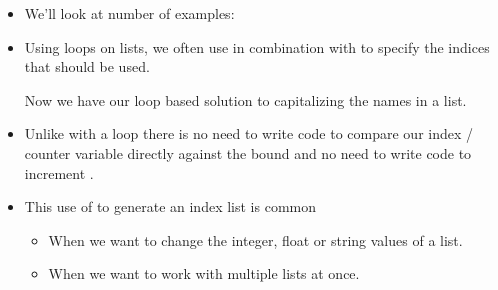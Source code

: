 \documentclass[letterpaper,10pt,english]{sphinxmanual}
\begin{document}
\begin{itemize}
\begin{itemize}
\end{itemize}

\item {} 
We’ll look at number of examples:

%
\begin{sphinxVerbatim}[commandchars=\\\{\}]
  
  
\end{sphinxVerbatim}

\item {} 
Using  loops on lists, we often use  in
combination with  to specify the indices that should be
used.

%
\begin{sphinxVerbatim}[commandchars=\\\{\}]
   
       
        \PYG{p}{[}\PYG{p}{]}  \PYG{p}{[}\PYG{p}{]}
\end{sphinxVerbatim}

Now we have our  loop based solution to capitalizing the
names in a list.

\item {} 
Unlike with a  loop there is no need to write code to
compare our index / counter variable  directly against the
bound and no need to write code to increment .

\item {} 
This use of  to generate an index list is common
\begin{itemize}
\item {} 
When we want to change the integer, float or string values of a
list.

\item {} 
When we want to work with multiple lists at once.

\end{itemize}

\end{itemize}
\end{document}
